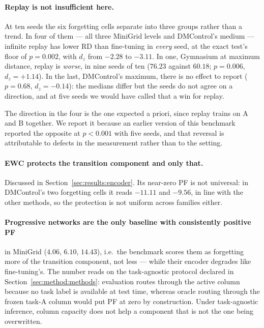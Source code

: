 \paragraph{Replay is not insufficient here.} At ten seeds the six forgetting
cells separate into three groups rather than a trend. In four of them --- all
three MiniGrid levels and DMControl's medium --- infinite replay has lower RD
than fine-tuning in \emph{every} seed, at the exact test's floor of
$p = 0.002$, with $d_z$ from $-2.28$ to $-3.11$. In one, Gymnasium at maximum
distance, replay is \emph{worse}, in nine seeds of ten ($76.23$ against
$60.18$; $p = 0.006$, $d_z = +1.14$). In the last, DMControl's maximum, there
is no effect to report ($p = 0.68$, $d_z = -0.14$): the medians differ but the
seeds do not agree on a direction, and at five seeds we would have called that
a win for replay.

The direction in the four is the one expected a priori, since replay trains on
A and B together. We report it because an earlier version of this benchmark
reported the opposite at $p < 0.001$ with five seeds, and that reversal is
attributable to defects in the measurement rather than to the setting.

\paragraph{EWC protects the transition component and only that.} Discussed in
Section~\ref{sec:results:encoder}. Its near-zero PF is not universal: in
DMControl's two forgetting cells it reads $-11.11$ and $-9.56$, in line with the
other methods, so the protection is not uniform across families either.

\paragraph{Progressive networks are the only baseline with consistently
positive PF} in MiniGrid ($4.06$, $6.10$, $14.43$), i.e.\ the benchmark scores
them as forgetting more of the transition component, not less --- while their
encoder degrades like fine-tuning's. The number reads on the task-agnostic
protocol declared in Section~\ref{sec:method:methods}: evaluation routes
through the active column because no task label is available at test time,
whereas oracle routing through the frozen task-A column would put PF at zero
by construction. Under task-agnostic inference, column capacity does not help
a component that is not the one being overwritten.

